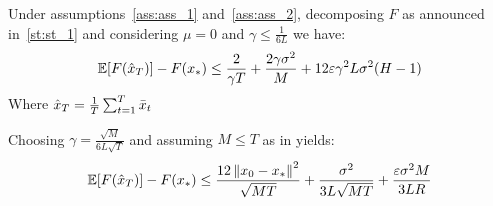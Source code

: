 \begin{theorem} \label{th:th_2}
    Under assumptions~\ref{ass:ass_1} and~\ref{ass:ass_2}, decomposing $F$ as announced in~\ref{st:st_1} and considering $\mu = 0$ and $\gamma \leq \frac{1}{6 L}$ we have:
    \begin{align}
        \E[F(\hat{x}_T)] - F(x_*) \leq
        \frac{2}{\gamma T} + \frac{2 \gamma \sigma^2}{M} + 12 \varepsilon \gamma^2 L \sigma^2 (H-1)
    \end{align}
    Where $\hat{x}_T = \frac{1}{T} \summ{t=1}{T} \bar{x}_t$
\end{theorem}

\begin{corollary} \label{}
    Choosing $\gamma = \frac{\sqrt{M}}{6 L\sqrt{T}}$ and assuming $M \leq T$ as in \cite{Khaled} yields:
    \begin{align}
        \E[F(\hat{x}_T)] - F(x_*)
        \leq
          \frac{12 \norm{x_0-x_*}^2}{\sqrt{MT}} + \frac{\sigma^2}{3 L\sqrt{MT}} + \frac{
          \varepsilon \sigma^2 M}{3LR}
    \end{align}
\end{corollary}
